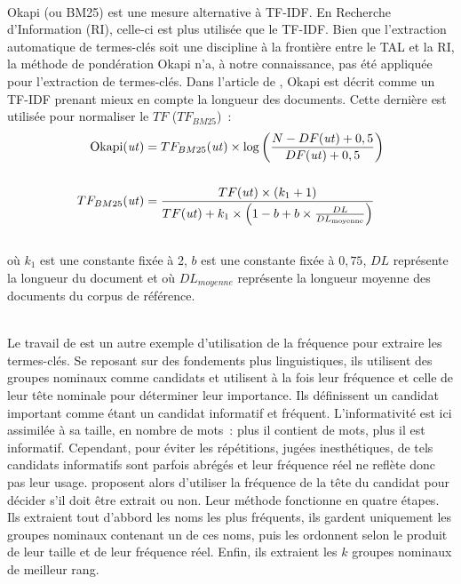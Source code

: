         ~\\Okapi (ou BM25) \cite{robertson1999okapi} est une mesure alternative
        à TF-IDF. En Recherche d'Information (RI), celle-ci est plus utilisée
        que le TF-IDF. Bien que l'extraction automatique de termes-clés soit
        une discipline à la frontière entre le TAL et la RI, la méthode de
        pondération Okapi n'a, à notre connaissance, pas été appliquée pour
        l'extraction de termes-clés. Dans l'article de
        , Okapi est décrit comme un TF-IDF
        prenant mieux en compte la longueur des documents. Cette dernière est
        utilisée pour normaliser le $TF$ ($TF_{BM25}$)~:
        \begin{align}
          \text{Okapi}(\text{\textit{ut}}) &= TF_{BM25}(\text{\textit{ut}}) \times \log\left(\frac{N - DF(\text{\textit{ut}}) + 0,5}{DF(\text{\textit{ut}}) + 0,5}\right) \label{math:okapi}\\
          \notag\\
          TF_{BM25}(\text{\textit{ut}}) &= \frac{TF(\text{\textit{ut}}) \times (k_1 + 1)}{TF(\text{\textit{ut}}) + k_1 \times \left(1 - b + b \times \frac{DL}{DL_{\text{moyenne}}}\right)} \label{math:tf_bm25}
        \end{align}\\
        où $k_1$ est une constante fixée à 2, $b$ est une constante fixée à
        $0,75$, $DL$ représente la longueur du document et où $DL_{moyenne}$
        représente la longueur moyenne des documents du corpus de référence.

        ~\\Le travail de  est un autre exemple
        d'utilisation de la fréquence pour extraire les termes-clés. Se reposant
        sur des fondements plus linguistiques, ils utilisent des groupes
        nominaux comme candidats et utilisent à la fois leur fréquence et celle
        de leur tête nominale pour déterminer leur importance. Ils définissent
        un candidat important comme étant un candidat informatif et fréquent.
        L'informativité est ici assimilée à sa taille, en nombre de mots~: plus
        il contient de mots, plus il est informatif. Cependant, pour éviter les
        répétitions, jugées inesthétiques, de tels candidats informatifs sont
        parfois abrégés et leur fréquence réel ne reflète donc pas leur usage.
         proposent alors d'utiliser la
        fréquence de la tête du candidat pour décider s'il doit être extrait ou
        non. Leur méthode fonctionne en quatre étapes. Ils extraient tout
        d'abbord les noms les plus fréquents, ils gardent uniquement les groupes
        nominaux contenant un de ces noms, puis les ordonnent selon le produit
        de leur taille et de leur fréquence réel. Enfin, ils extraient les $k$
        groupes nominaux de meilleur rang.

